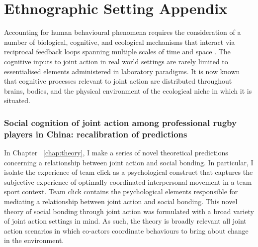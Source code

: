 
\chapter{\label{app4:ethnoSetting}Ethnographic Setting Appendix}

                                                \begin{CJK}{UTF8}{gbsn}


Accounting for human behavioural phenomena requires the consideration of a number of biological, cognitive, and ecological mechanisms that interact via reciprocal feedback loops spanning multiple scales of time and space \citep{Fuentes2015}.  The cognitive inputs to joint action in real world settings are rarely limited to essentialised elements administered in laboratory paradigms.  It is now known that cognitive processes relevant to joint action are distributed throughout brains, bodies, and the physical environment of the ecological niche in which it is situated.

\subsection{Social cognition of joint action among professional rugby players in China: recalibration of predictions}

In Chapter ~\ref{chap:theory}, I make a series of novel theoretical predictions concerning a relationship between joint action and social bonding. In particular, I isolate the experience of team click as a psychological construct that captures the subjective experience of optimally coordinated interpersonal movement in a team sport context.  Team click  contains the psychological elements responsible for mediating a relationship between joint action and social bonding.  This novel theory of social bonding through joint action was formulated with a broad variety of joint action settings in mind.  As such, the theory is broadly relevant all joint action scenarios in which co-actors coordinate behaviours to bring about change in the environment.


\end{CJK}
